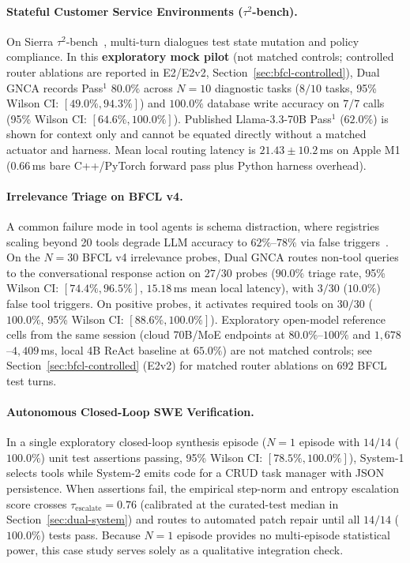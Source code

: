 \documentclass[10pt,twocolumn,letterpaper]{article}
\begin{document}
\paragraph{Stateful Customer Service Environments (\texorpdfstring{$\tau^2$-bench}{tau2-bench}).}
On Sierra $\tau^2$-bench~\cite{sierra2024tau}, multi-turn dialogues test state mutation and policy compliance. In this \textbf{exploratory mock pilot} (not matched controls; controlled router ablations are reported in E2/E2v2, Section~\ref{sec:bfcl-controlled}), Dual GNCA records Pass$^1$ $\mathbf{80.0\%}$ across $N=10$ diagnostic tasks ($8/10$ tasks, 95\% Wilson CI: $[49.0\%, 94.3\%]$) and $100.0\%$ database write accuracy on $7/7$ calls (95\% Wilson CI: $[64.6\%, 100.0\%]$). Published Llama-3.3-70B Pass$^1$ ($62.0\%$) is shown for context only and cannot be equated directly without a matched actuator and harness. Mean local routing latency is $21.43\pm 10.2$\,ms on Apple M1 ($0.66$\,ms bare C++/PyTorch forward pass plus Python harness overhead).

\paragraph{Irrelevance Triage on BFCL v4.}
A common failure mode in tool agents is schema distraction, where registries scaling beyond 20 tools degrade LLM accuracy to $62\%$--$78\%$ via false triggers~\cite{gorilla-bfcl}. On the $N=30$ BFCL v4 irrelevance probes, Dual GNCA routes non-tool queries to the conversational response action on $27/30$ probes ($\mathbf{90.0\%}$ triage rate, 95\% Wilson CI: $[74.4\%, 96.5\%]$, $15.18$\,ms mean local latency), with $3/30$ ($10.0\%$) false tool triggers. On positive probes, it activates required tools on $30/30$ ($100.0\%$, 95\% Wilson CI: $[88.6\%, 100.0\%]$). Exploratory open-model reference cells from the same session (cloud 70B/MoE endpoints at $80.0\%$--$100\%$ and $1{,}678$--$4{,}409$\,ms, local 4B ReAct baseline at $65.0\%$) are not matched controls; see Section~\ref{sec:bfcl-controlled} (E2v2) for matched router ablations on 692 BFCL test turns.

\paragraph{Autonomous Closed-Loop SWE Verification.}
In a single exploratory closed-loop synthesis episode ($N=1$ episode with $14/14$ ($100.0\%$) unit test assertions passing, 95\% Wilson CI: $[78.5\%, 100.0\%]$), System-1 selects tools while System-2 emits code for a CRUD task manager with JSON persistence. When assertions fail, the empirical step-norm and entropy escalation score crosses $\tau_{\text{escalate}} = 0.76$ (calibrated at the curated-test median in Section~\ref{sec:dual-system}) and routes to automated patch repair until all $14/14$ ($100.0\%$) tests pass. Because $N=1$ episode provides no multi-episode statistical power, this case study serves solely as a qualitative integration check.
\end{document}
